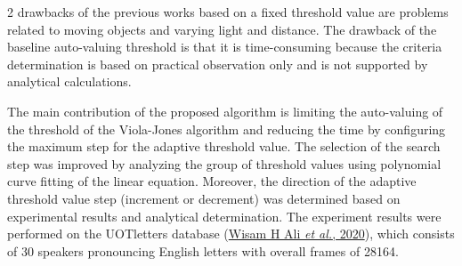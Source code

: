 \documentclass[9pt]{extarticle}
\begin{document}
\begin{multicols}{2}
drawbacks of the previous works based on a fixed threshold value are problems related to moving objects and varying light and distance. The drawback of the baseline auto-valuing threshold is that it is time-consuming because the criteria determination is based on practical observation only and is not supported by analytical calculations.

The main contribution of the proposed algorithm is limiting the auto-valuing of the threshold of the Viola-Jones algorithm and reducing the time by configuring the maximum step for the adaptive threshold value. The selection of the search step was improved by analyzing the group of threshold values using polynomial curve fitting of the linear equation. Moreover, the direction of the adaptive threshold value step (increment or decrement) was determined based on experimental results and analytical determination. The experiment results were performed on the UOTletters database (\hyperlink{ref:1}{Wisam H Ali \textit{et al.}, 2020}), which consists of 30 speakers pronouncing English letters with overall frames of 28164.

\end{multicols}
\noindent
\end{document}
